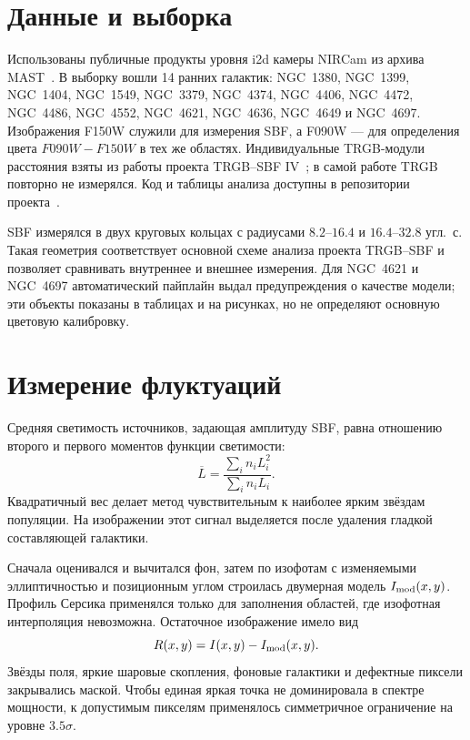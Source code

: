 \section{Данные и выборка}

Использованы публичные продукты уровня i2d камеры NIRCam из архива MAST~\cite{MAST}. В выборку вошли 14 ранних галактик: NGC~1380, NGC~1399, NGC~1404, NGC~1549, NGC~3379, NGC~4374, NGC~4406, NGC~4472, NGC~4486, NGC~4552, NGC~4621, NGC~4636, NGC~4649 и NGC~4697. Изображения F150W служили для измерения SBF, а F090W --- для определения цвета $F090W-F150W$ в тех же областях. Индивидуальные TRGB-модули расстояния взяты из работы проекта TRGB--SBF IV~\cite{Chazov2026}; в самой работе TRGB повторно не измерялся. Код и таблицы анализа доступны в репозитории проекта~\cite{GitHubRepo}.

SBF измерялся в двух круговых кольцах с радиусами $8.2$--$16.4$ и $16.4$--$32.8$ угл.~с. Такая геометрия соответствует основной схеме анализа проекта TRGB--SBF и позволяет сравнивать внутреннее и внешнее измерения. Для NGC~4621 и NGC~4697 автоматический пайплайн выдал предупреждения о качестве модели; эти объекты показаны в таблицах и на рисунках, но не определяют основную цветовую калибровку.

\section{Измерение флуктуаций}

Средняя светимость источников, задающая амплитуду SBF, равна отношению второго и первого моментов функции светимости:
\begin{equation}
    \overline L=\frac{\sum_i n_iL_i^2}{\sum_i n_iL_i}.
    \label{buk:eq:sbf_luminosity}
\end{equation}
Квадратичный вес делает метод чувствительным к наиболее ярким звёздам популяции. На изображении этот сигнал выделяется после удаления гладкой составляющей галактики.

Сначала оценивался и вычитался фон, затем по изофотам с изменяемыми эллиптичностью и позиционным углом строилась двумерная модель $I_{\rm mod}(x,y)$. Профиль Серсика применялся только для заполнения областей, где изофотная интерполяция невозможна. Остаточное изображение имело вид
\begin{equation}
    R(x,y)=I(x,y)-I_{\rm mod}(x,y).
\end{equation}
Звёзды поля, яркие шаровые скопления, фоновые галактики и дефектные пиксели закрывались маской. Чтобы единая яркая точка не доминировала в спектре мощности, к допустимым пикселям применялось симметричное ограничение на уровне $3.5\sigma$.

